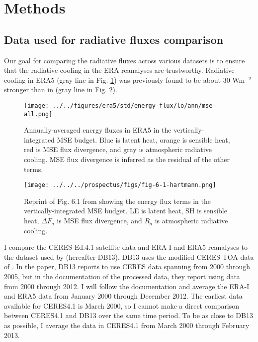 \documentclass[11pt]{article}
\begin{document}
\section{Methods}
\label{sec:org3a59a29}
\subsection{Data used for radiative fluxes comparison}
\label{sec:orga5fc947}
Our goal for comparing the radiative fluxes across various datasets is to ensure that the radiative cooling in the ERA reanalyses are trustworthy. Radiative cooling in ERA5 (gray line in Fig. \ref{fig:org1588f96}) was previously found to be about 30 Wm\(^{-2}\) stronger than in \cite{hartmann_global_2016} (gray line in Fig. \ref{fig:org4a5a954}).

\begin{figure}[htbp]
\centering
\texttt{[image: ../../figures/era5/std/energy-flux/lo/ann/mse-all.png]}
\caption{\label{fig:org1588f96}Annually-averaged energy fluxes in ERA5 in the vertically-integrated MSE budget. Blue is latent heat, orange is sensible heat, red is MSE flux divergence, and gray is atmospheric radiative cooling. MSE flux divergence is inferred as the residual of the other terms.}
\end{figure}

\begin{figure}[htbp]
\centering
\texttt{[image: ../../../prospectus/figs/fig-6-1-hartmann.png]}
\caption{\label{fig:org4a5a954}Reprint of Fig. 6.1 from \cite{hartmann_global_2016} showing the energy flux terms in the vertically-integrated MSE budget. LE is latent heat, SH is sensible heat, \(\Delta F_a\) is MSE flux divergence, and \(R_a\) is atmospheric radiative cooling.}
\end{figure}

I compare the CERES Ed.4.1 satellite data and ERA-I and ERA5 reanalyses to the dataset used by \cite{donohoe_seasonal_2013} (hereafter DB13). DB13 uses the modified CERES TOA data of \cite{fasullo_annual_2008}. In the paper, DB13 reports to use CERES data spanning from 2000 through 2005, but in the documentation of the processed data, they report using data from 2000 through 2012. I will follow the documentation and average the ERA-I and ERA5 data from January 2000 through December 2012. The earliest data available for CERES4.1 is March 2000, so I cannot make a direct comparison between CERES4.1 and DB13 over the same time period. To be as close to DB13 as possible, I average the data in CERES4.1 from March 2000 through February 2013.
\end{document}
